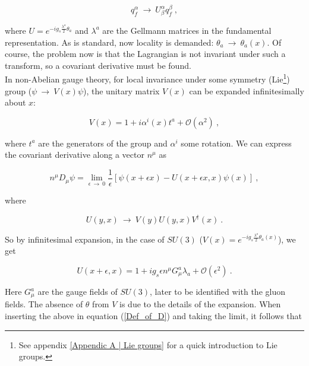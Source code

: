 \documentclass[10pt,twoside]{report}
\begin{document}
	\begin{equation}
	q_f^\alpha \:\rightarrow\: U^\alpha_\beta q_f^\beta \:,
	\end{equation} 
	
	\noindent where $U = e^{-ig_s\frac{\lambda^a}{2}\theta_a}$ and $\lambda^a$ are the Gellmann matrices in the fundamental representation. As is standard, now locality is demanded: $\theta_a \:\rightarrow\: \theta_a(x)$. Of course, the problem now is that the Lagrangian is not invariant under such a transform, so a covariant derivative must be found.\\
	
	In non-Abelian gauge theory, for local invariance under some symmetry (Lie\footnote{See appendix \ref{Appendic A | Lie groups} for a quick introduction to Lie groups.}) group ($\psi \:\rightarrow\: V(x)\psi$), the unitary matrix $V(x)$ can be expanded infinitesimally about $x$:
	
	\begin{equation}
	V(x) = 1 + i\alpha^i(x)t^a + \mathcal{O}(\alpha^2)\:,
	\end{equation}
	
	\noindent where $t^a$ are the generators of the group and $\alpha^i$ some rotation. We can express the covariant derivative along a vector $n^\mu$ as
	
	\begin{equation}
	n^\mu D_\mu\psi = \lim_{\epsilon\:\rightarrow\:0} \frac{1}{\epsilon}\left[\psi(x+\epsilon x) - U(x+\epsilon x,x)\psi(x)\right]\:,
	\label{Def_of_D}
	\end{equation}
	
	\noindent where
	
	\begin{equation}
	U(y,x) \:\rightarrow\: V(y)U(y,x)V^\dagger(x)\:.
	\end{equation}
	
	So by infinitesimal expansion, in the case of $SU(3)$ ($V(x) = e^{-ig_s\frac{\lambda^a}{2}\theta_a(x)}$), we get
	
	\begin{equation}
	U(x+\epsilon, x) = 1 + ig_s\epsilon n^\mu G_\mu^a \lambda_a + \mathcal{O}(\epsilon^2)\:.
	\end{equation}
	
	Here $G_\mu^a$ are the gauge fields of $SU(3)$, later to be identified with the gluon fields. The absence of $\theta$ from $V$ is due to the details of the expansion. When inserting the above in equation (\ref{Def_of_D}) and taking the limit, it follows that
	
\end{document}
